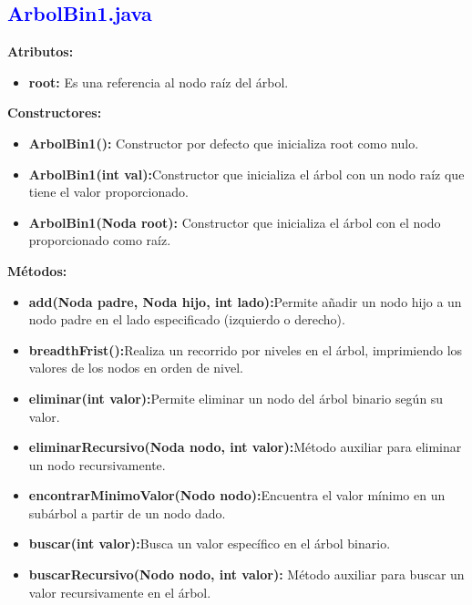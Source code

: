 \documentclass[12pt]{article}
\begin{document}
\subsection{\textcolor{blue}{ArbolBin1.java}}

\textbf{Atributos:}
\begin{itemize}
    \item \textbf{root:} Es una referencia al nodo raíz del árbol.
    
\end{itemize}

\textbf{Constructores:}
\begin{itemize}
    \item \textbf{ArbolBin1():} Constructor por defecto que inicializa root como nulo.
    
    \item \textbf{ArbolBin1(int val):}Constructor que inicializa el árbol con un nodo raíz que tiene el valor proporcionado.
    
     \item \textbf{ArbolBin1(Noda root): }Constructor que inicializa el árbol con el nodo proporcionado como raíz.
\end{itemize}

\textbf{Métodos:}
\begin{itemize}
    \item \textbf{add(Noda padre, Noda hijo, int lado):}Permite añadir un nodo hijo a un nodo padre en el lado especificado (izquierdo o derecho).
    
    \item \textbf{breadthFrist():}Realiza un recorrido por niveles en el árbol, imprimiendo los valores de los nodos en orden de nivel.

    \item \textbf{eliminar(int valor):}Permite eliminar un nodo del árbol binario según su valor.

    \item \textbf{eliminarRecursivo(Noda nodo, int valor):}Método auxiliar para eliminar un nodo recursivamente.
    
    \item \textbf{encontrarMinimoValor(Nodo nodo):}Encuentra el valor mínimo en un subárbol a partir de un nodo dado.
    
    \item \textbf{buscar(int valor):}Busca un valor específico en el árbol binario.

    \item \textbf{buscarRecursivo(Nodo nodo, int valor): }Método auxiliar para buscar un valor recursivamente en el árbol.
    
\end{itemize}
\end{document}
